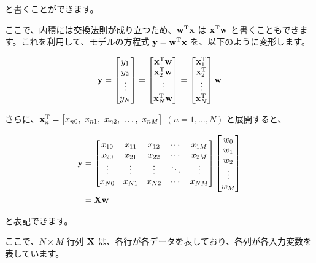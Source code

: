 と書くことができます。


ここで、内積には交換法則が成り立つため、${\bf w}^{\rm T}{\bf x}$ は ${\bf x}^{\rm T}{\bf w}$ と書くこともできます。これを利用して、モデルの方程式 ${\bf y} = {\bf w}^{\rm T}{\bf x}$ を、以下のように変形します。


\[
\begin{aligned}
{\bf y} =
\begin{bmatrix}
y_1 \\
y_2 \\
\vdots \\
y_N
\end{bmatrix} =
\begin{bmatrix}
{\bf x}_1^{\rm T}{\bf w} \\
{\bf x}_2^{\rm T}{\bf w} \\
\vdots \\
{\bf x}_N^{\rm T}{\bf w}
\end{bmatrix} =
\begin{bmatrix}
{\bf x}_1^{\rm T} \\
{\bf x}_2^{\rm T} \\
\vdots \\
{\bf x}_N^{\rm T}
\end{bmatrix}
{\bf w}
\end{aligned}
\]


さらに、${\bf x}_n^{\rm T} = \bigl[ x_{n0},\ x_{n1},\  x_{n2},\ \dots,\  x_{nM} \bigr]$ $(n = 1, \dots, N)$ と展開すると、


\[
\begin{aligned}
{\bf y}
&= \begin{bmatrix}
x_{10} & x_{11} & x_{12} & \cdots & x_{1M} \\
x_{20} & x_{21} & x_{22} & \cdots & x_{2M} \\
\vdots & \vdots & \vdots & \ddots & \vdots \\
x_{N0} & x_{N1} & x_{N2} & \cdots & x_{NM}
\end{bmatrix}
\begin{bmatrix}
w_{0} \\
w_{1} \\
w_{2} \\
\vdots \\
w_{M}
\end{bmatrix} \\
&= {\bf X}{\bf w}
\end{aligned}
\]


と表記できます。

ここで、$N \times M$ 行列 ${\bf X}$ は、各行が各データを表しており、各列が各入力変数を表しています。

